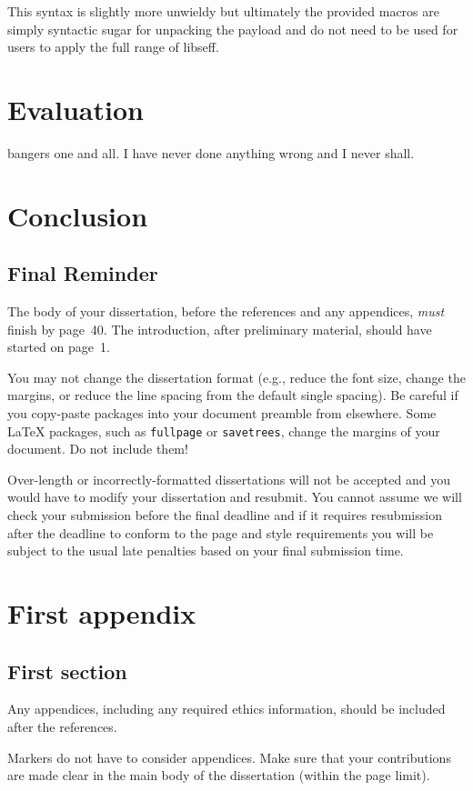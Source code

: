 \documentclass[logo,bsc,singlespacing,parskip,online]{infthesis}
\begin{document}
This syntax is slightly more unwieldy but ultimately the provided macros are simply syntactic sugar for unpacking the payload and do not need to be used for users to apply the full range of libseff.

\chapter{Evaluation}

bangers one and all. I have never done anything wrong and I never shall.

\chapter{Conclusion}

\section{Final Reminder}

The body of your dissertation, before the references and any appendices,
\emph{must} finish by page~40. The introduction, after preliminary material,
should have started on page~1.

You may not change the dissertation format (e.g., reduce the font size, change
the margins, or reduce the line spacing from the default single spacing). Be
careful if you copy-paste packages into your document preamble from elsewhere.
Some \LaTeX{} packages, such as \texttt{fullpage} or \texttt{savetrees}, change
the margins of your document. Do not include them!

Over-length or incorrectly-formatted dissertations will not be accepted and you
would have to modify your dissertation and resubmit. You cannot assume we will
check your submission before the final deadline and if it requires resubmission
after the deadline to conform to the page and style requirements you will be
subject to the usual late penalties based on your final submission time.

% 




\appendix

\chapter{First appendix}

\section{First section}

Any appendices, including any required ethics information, should be included
after the references.

Markers do not have to consider appendices. Make sure that your contributions
are made clear in the main body of the dissertation (within the page limit).
\end{document}

